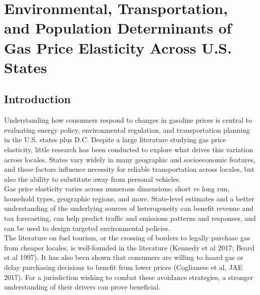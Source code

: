\chapter[Chapter 3]{Environmental, Transportation, and Population Determinants of Gas Price Elasticity Across U.S. States}

\graphicspath{{C:/Users/david/coding/03_GAS_TAX_HETEROGENEITY_paper/6000_LaTeX/}}

\section{Introduction} 
Understanding how consumers respond to changes in gasoline prices is central to evaluating energy policy, environmental regulation, and transportation planning in the U.S. states plus D.C. Despite a large literature studying gas price elasticity, little research has been conducted to explore what drives this variation across locales. States vary widely in many geographic and socioeconomic features, and these factors influence necessity for reliable transportation across locales, but also the ability to substitute away from personal vehicles. \\ 

Gas price elasticity varies across numerous dimensions; short vs long run, household types, geographic regions, and more. State-level estimates and a better understanding of the underlying sources of heterogeneity can benefit revenue and tax forecasting, can help predict traffic and emissions patterns and responses, and can be used to design targeted environmental policies. \\

The literature on fuel tourism, or the crossing of borders to legally purchase gas from cheaper locales, is well-founded in the literature (Kennedy et al 2017; Beard et al 1997). It has also been shown that consumers are willing to hoard gas or delay purchasing decisions to benefit from lower prices (Coglianese et al, JAE 2017). For a jurisdiction wishing to combat these avoidance strategies, a stronger understanding of their drivers can prove beneficial. \\

